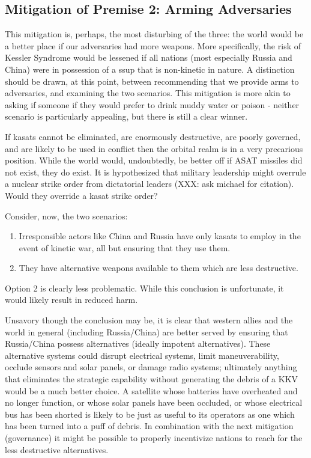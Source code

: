 \subsection{Mitigation of Premise 2: Arming Adversaries}
This mitigation is, perhaps, the most disturbing of the three: the
world would be a better place if our adversaries had more weapons.
More specifically, the risk of Kessler Syndrome would be lessened if
all nations (most especially Russia and China) were in possession of a
\acf{ssup} that is non-kinetic in nature.  A distinction should be
drawn, at this point, between recommending that we provide arms to
adversaries, and examining the two scenarios.  This mitigation is more
akin to asking if someone if they would prefer to drink muddy water or
poison - neither scenario is particularly appealing, but there is
still a clear winner.

If \acp{kasat} cannot be eliminated, are enormously destructive, are
poorly governed, and are likely to be used in conflict then the
orbital realm is in a very precarious position.  While the world
would, undoubtedly, be better off if ASAT missiles did not exist, they
do exist.  It is hypothesized that military leadership might overrule
a nuclear strike order from dictatorial leaders (XXX: ask michael for
citation).  Would they override a \ac{kasat} strike order?

Consider, now, the two scenarios:

\begin{enumerate}
\item Irresponsible actors like China and Russia have only \acp{kasat}
  to employ in the event of kinetic war, all but ensuring that they
  use them.

\item They have alternative weapons available to them which are less
  destructive.
\end{enumerate}

Option 2 is clearly less problematic.  While this conclusion is
unfortunate, it would likely result in reduced harm.

Unsavory though the conclusion may be, it is clear that western allies
and the world in general (including Russia/China) are better served by
ensuring that Russia/China possess alternatives (ideally impotent
alternatives).  These alternative systems could disrupt electrical
systems, limit maneuverability, occlude sensors and solar panels, or
damage radio systems; ultimately anything that eliminates the
strategic capability without generating the debris of a KKV would be a
much better choice.  A satellite whose batteries have overheated and
no longer function, or whose solar panels have been occluded, or whose
electrical bus has been shorted is likely to be just as useful to its
operators as one which has been turned into a puff of debris.  In
combination with the next mitigation (governance) it might be possible
to properly incentivize nations to reach for the less destructive
alternatives.

